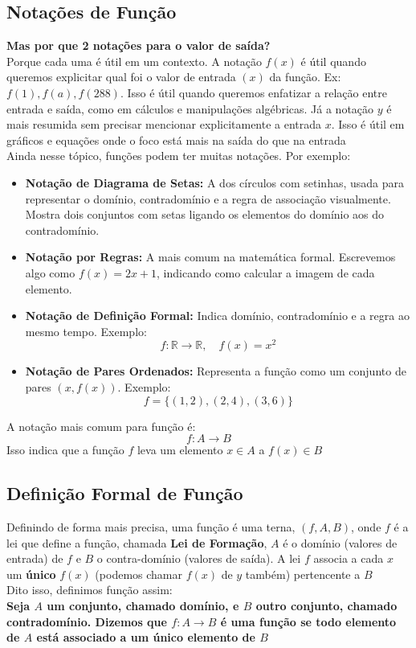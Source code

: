 \documentclass{article}
\begin{document}
\subsection{Notações de Função}

\textbf{Mas por que 2 notações para o valor de saída?}
\\[5pt]
Porque cada uma é útil em um contexto. A notação $f(x)$ é útil quando queremos explicitar qual foi o valor de entrada $(x)$ da função. Ex: $f(1), f(a), f(288)$. Isso é útil quando queremos enfatizar a relação entre entrada e saída, como em cálculos e manipulações algébricas. Já a notação $y$ é mais resumida sem precisar mencionar explicitamente a entrada $x$. Isso é útil em gráficos e equações onde o foco está mais na saída do que na entrada
\\[5pt]
Ainda nesse tópico, funções podem ter muitas notações. Por exemplo:
\begin{itemize}
    
    \item \textbf{Notação de Diagrama de Setas:} A dos círculos com setinhas, usada para representar o domínio, contradomínio e a regra de associação visualmente. Mostra dois conjuntos com setas ligando os elementos do domínio aos do contradomínio.
    
    \item \textbf{Notação por Regras:} A mais comum na matemática formal. Escrevemos algo como \( f(x) = 2x + 1 \), indicando como calcular a imagem de cada elemento.
    
    \item \textbf{Notação de Definição Formal:} Indica domínio, contradomínio e a regra ao mesmo tempo. Exemplo: 
    \[
    f: \mathbb{R} \to \mathbb{R}, \quad f(x) = x^2
    \]
    
    \item \textbf{Notação de Pares Ordenados:} Representa a função como um conjunto de pares \( (x, f(x)) \). Exemplo: 
    \[
    f = \{ (1, 2), (2, 4), (3, 6) \}
    \]
\end{itemize}

A notação mais comum para função é:
\[
f: A \to B
\]
Isso indica que a função $f$ leva um elemento $x \in A$ a $f(x) \in B$

\subsection{Definição Formal de Função}
Definindo de forma mais precisa, uma função é uma terna, $(f, A, B)$, onde $f$ é a lei que define a função, chamada \textbf{Lei de Formação}, $A$ é o domínio (valores de entrada) de $f$ e $B$ o contra-domínio (valores de saída). A lei $f$ associa a cada $x$ um \textbf{único} $f(x)$ (podemos chamar $f(x)$ de $y$ também) pertencente a $B$
\\[10pt]
Dito isso, definimos função assim:
\\[10pt]
\textbf{Seja \( A \) um conjunto, chamado domínio, e \( B \) outro conjunto, chamado contradomínio. Dizemos que \( f : A \to B \) é uma função se todo elemento de \( A \) está associado a um único elemento de \( B \)}
\end{document}
